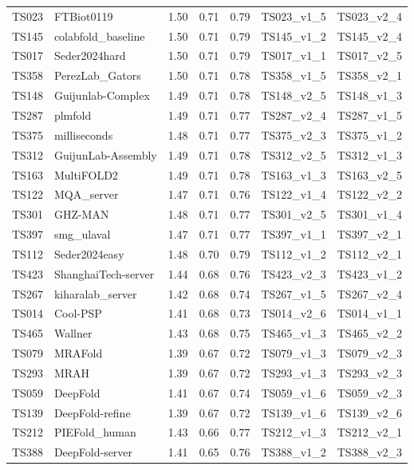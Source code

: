 \begin{longtable}{lllllll}
TS023 & FTBiot0119 & 1.50 & 0.71 & 0.79 & TS023\_v1\_5 & TS023\_v2\_4 \\ 
TS145 & colabfold\_baseline & 1.50 & 0.71 & 0.79 & TS145\_v1\_2 & TS145\_v2\_4 \\ 
TS017 & Seder2024hard & 1.50 & 0.71 & 0.79 & TS017\_v1\_1 & TS017\_v2\_5 \\ 
TS358 & PerezLab\_Gators & 1.50 & 0.71 & 0.78 & TS358\_v1\_5 & TS358\_v2\_1 \\ 
TS148 & Guijunlab-Complex & 1.49 & 0.71 & 0.78 & TS148\_v2\_5 & TS148\_v1\_3 \\ 
TS287 & plmfold & 1.49 & 0.71 & 0.77 & TS287\_v2\_4 & TS287\_v1\_5 \\ 
TS375 & milliseconds & 1.48 & 0.71 & 0.77 & TS375\_v2\_3 & TS375\_v1\_2 \\ 
TS312 & GuijunLab-Assembly & 1.49 & 0.71 & 0.78 & TS312\_v2\_5 & TS312\_v1\_3 \\ 
TS163 & MultiFOLD2 & 1.49 & 0.71 & 0.78 & TS163\_v1\_3 & TS163\_v2\_5 \\ 
TS122 & MQA\_server & 1.47 & 0.71 & 0.76 & TS122\_v1\_4 & TS122\_v2\_2 \\ 
TS301 & GHZ-MAN & 1.48 & 0.71 & 0.77 & TS301\_v2\_5 & TS301\_v1\_4 \\ 
TS397 & smg\_ulaval & 1.47 & 0.71 & 0.77 & TS397\_v1\_1 & TS397\_v2\_1 \\ 
TS112 & Seder2024easy & 1.48 & 0.70 & 0.79 & TS112\_v1\_2 & TS112\_v2\_1 \\ 
TS423 & ShanghaiTech-server & 1.44 & 0.68 & 0.76 & TS423\_v2\_3 & TS423\_v1\_2 \\ 
TS267 & kiharalab\_server & 1.42 & 0.68 & 0.74 & TS267\_v1\_5 & TS267\_v2\_4 \\ 
TS014 & Cool-PSP & 1.41 & 0.68 & 0.73 & TS014\_v2\_6 & TS014\_v1\_1 \\ 
TS465 & Wallner & 1.43 & 0.68 & 0.75 & TS465\_v1\_3 & TS465\_v2\_2 \\ 
TS079 & MRAFold & 1.39 & 0.67 & 0.72 & TS079\_v1\_3 & TS079\_v2\_3 \\ 
TS293 & MRAH & 1.39 & 0.67 & 0.72 & TS293\_v1\_3 & TS293\_v2\_3 \\ 
TS059 & DeepFold & 1.41 & 0.67 & 0.74 & TS059\_v1\_6 & TS059\_v2\_3 \\ 
TS139 & DeepFold-refine & 1.39 & 0.67 & 0.72 & TS139\_v1\_6 & TS139\_v2\_6 \\ 
TS212 & PIEFold\_human & 1.43 & 0.66 & 0.77 & TS212\_v1\_3 & TS212\_v2\_1 \\ 
TS388 & DeepFold-server & 1.41 & 0.65 & 0.76 & TS388\_v1\_2 & TS388\_v2\_3 \\ 

\end{longtable}
